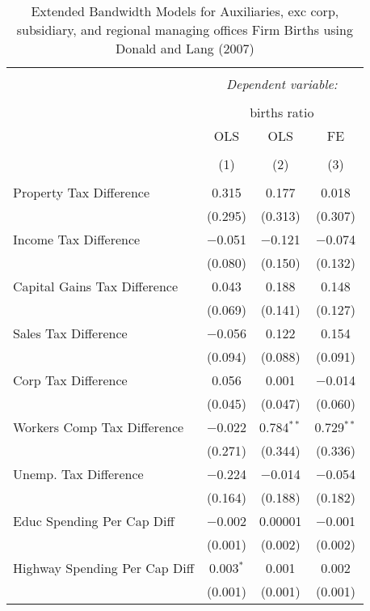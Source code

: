 
\begin{table}[!htbp] \centering 
  \caption{Extended Bandwidth Models for  Auxiliaries, exc corp, subsidiary, and regional managing offices Firm Births using Donald and Lang (2007)} 
  \label{} 
\begin{tabular}{@{\extracolsep{5pt}}lccc} 
\\[-1.8ex]\hline 
\hline \\[-1.8ex] 
 & \multicolumn{3}{c}{\textit{Dependent variable:}} \\ 
\cline{2-4} 
\\[-1.8ex] & \multicolumn{3}{c}{births ratio} \\ 
 & OLS & OLS & FE \\ 
\\[-1.8ex] & (1) & (2) & (3)\\ 
\hline \\[-1.8ex] 
 Property Tax Difference & 0.315 & 0.177 & 0.018 \\ 
  & (0.295) & (0.313) & (0.307) \\ 
  Income Tax Difference & $-$0.051 & $-$0.121 & $-$0.074 \\ 
  & (0.080) & (0.150) & (0.132) \\ 
  Capital Gains Tax Difference & 0.043 & 0.188 & 0.148 \\ 
  & (0.069) & (0.141) & (0.127) \\ 
  Sales Tax Difference & $-$0.056 & 0.122 & 0.154 \\ 
  & (0.094) & (0.088) & (0.091) \\ 
  Corp Tax Difference & 0.056 & 0.001 & $-$0.014 \\ 
  & (0.045) & (0.047) & (0.060) \\ 
  Workers Comp Tax Difference & $-$0.022 & 0.784$^{**}$ & 0.729$^{**}$ \\ 
  & (0.271) & (0.344) & (0.336) \\ 
  Unemp. Tax Difference & $-$0.224 & $-$0.014 & $-$0.054 \\ 
  & (0.164) & (0.188) & (0.182) \\ 
  Educ Spending Per Cap Diff & $-$0.002 & 0.00001 & $-$0.001 \\ 
  & (0.001) & (0.002) & (0.002) \\ 
  Highway Spending Per Cap Diff & 0.003$^{*}$ & 0.001 & 0.002 \\ 
  & (0.001) & (0.001) & (0.001) \\ 

\end{tabular}
\end{table}
